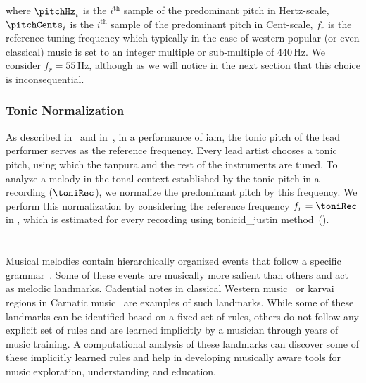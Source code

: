 {\noindent where $\pitchHz_i$ is the $i^\mathrm{th}$ sample of the predominant pitch in Hertz-scale, $\pitchCents_i$ is the $i^\mathrm{th}$ sample of the predominant pitch in Cent-scale, $f_r$ is the reference tuning frequency which typically in the case of western popular (or even classical) music is set to an integer multiple or sub-multiple of 440\,Hz. We consider $f_r=55$\,Hz, although as we will notice in the next section that this choice is inconsequential.
  

\subsubsection{Tonic Normalization}
\label{sec:tonic_normalization}

As described in~ and in~, in a performance of \gls{iam}, the tonic pitch of the lead performer serves as the reference frequency. Every lead artist chooses a tonic pitch, using which the \gls{tanpura} and the rest of the instruments are tuned. To analyze a melody in the tonal context established by the tonic pitch in a recording ($\toniRec$), we normalize the predominant pitch by this frequency. We perform this normalization by considering the reference frequency $f_r=\toniRec$ in , which is estimated for every recording using \acrshort{tonicid_justin} method~().


\section{}
\label{sec:pre_processing_nyas_segmentation}

Musical melodies contain hierarchically organized events that follow a specific grammar~\citep{Patel07BOOK}. Some of these events are musically more salient than others and act as melodic landmarks. Cadential notes in classical Western music~\citep{GroveCadence} or \gls{karvai} regions in Carnatic music~\citep{sambamoorthy:1998} are examples of such landmarks. While some of these landmarks can be identified based on a fixed set of rules, others do not follow any explicit set of rules and are learned implicitly by a musician through years of music training. A computational analysis of these landmarks can discover some of these implicitly learned rules and help in developing musically aware tools for music exploration, understanding and education. 

}
